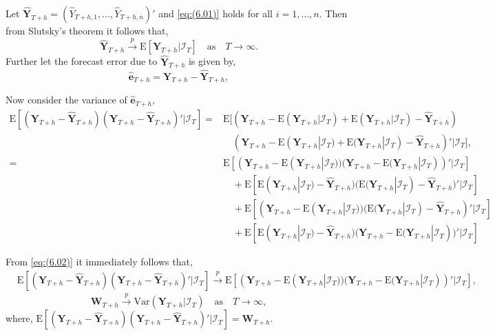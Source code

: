 \documentclass[a4paper, 11pt]{article}
\def\E{\text{E}}
\begin{document}
Let $\hat{\bm{Y}}_{T+h}=(\hat{Y}_{T+h,1},\dots,\hat{Y}_{T+h,n})'$ and \eqref{eq:(6.01)} holds for all $i=1,\dots,n$. Then from Slutsky's theorem it follows that,
\begin{equation}\label{eq:(6.02)}
\hat{\bm{Y}}_{T+h} \overset{p}{\to} \E[\bm{Y}_{T+h}|\bm{\mathcal{I}}_T] \quad \text{as} \quad T \to \infty.
\end{equation}
Further let the forecast error due to $\hat{\bm{Y}}_{T+h}$ is given by,
\begin{equation*}
\hat{\bm{e}}_{T+h} = \bm{Y}_{T+h}-\hat{\bm{Y}}_{T+h},
\end{equation*}

Now consider the variance of $\hat{\bm{e}}_{T+h}$,
\begin{align*}
\E[(\bm{Y}_{T+h} - \hat{\bm{Y}}_{T+h})(\bm{Y}_{T+h} - \hat{\bm{Y}}_{T+h})'|\bm{\mathcal{I}}_T] = &
\E[(\bm{Y}_{T+h} - \E(\bm{Y}_{T+h}|\bm{\mathcal{I}}_T) + \E(\bm{Y}_{T+h}|\bm{\mathcal{I}}_T)- \hat{\bm{Y}}_{T+h})\\
& \quad
(\bm{Y}_{T+h} - \E(\bm{Y}_{T+h}|\bm{\mathcal{I}}_T) + \E(\bm{Y}_{T+h}|\bm{\mathcal{I}}_T) - \hat{\bm{Y}}_{T+h})'|\bm{\mathcal{I}}_T],\\
= &
\E[(\bm{Y}_{T+h} - \E(\bm{Y}_{T+h}|\bm{\mathcal{I}}_T))(\bm{Y}_{T+h} - \E(\bm{Y}_{T+h}|\bm{\mathcal{I}}_T))'|\bm{\mathcal{I}}_T]\\
& \quad
+ \E[\E(\bm{Y}_{T+h}|\bm{\mathcal{I}}_T) - \hat{\bm{Y}}_{T+h})(\E(\bm{Y}_{T+h}|\bm{\mathcal{I}}_T) - \hat{\bm{Y}}_{T+h})'|\bm{\mathcal{I}}_T]\\
& \quad
+  \E[(\bm{Y}_{T+h} - \E(\bm{Y}_{T+h}|\bm{\mathcal{I}}_T))(\E(\bm{Y}_{T+h}|\bm{\mathcal{I}}_T) - \hat{\bm{Y}}_{T+h})'|\bm{\mathcal{I}}_T]\\
&  \quad
+ \E[\E(\bm{Y}_{T+h}|\bm{\mathcal{I}}_T) - \hat{\bm{Y}}_{T+h})(\bm{Y}_{T+h} - \E(\bm{Y}_{T+h}|\bm{\mathcal{I}}_T))'|\bm{\mathcal{I}}_T]
\end{align*}

From \eqref{eq:(6.02)} it immediately follows that,
\begin{align*}
&\E[(\bm{Y}_{T+h} - \hat{\bm{Y}}_{T+h})(\bm{Y}_{T+h} - \hat{\bm{Y}}_{T+h})'|\bm{\mathcal{I}}_T] \overset{p}{\to} \E[(\bm{Y}_{T+h} - \E(\bm{Y}_{T+h}|\bm{\mathcal{I}}_T))(\bm{Y}_{T+h} - \E(\bm{Y}_{T+h}|\bm{\mathcal{I}}_T))'|\bm{\mathcal{I}}_T],
\end{align*}
\begin{equation}
\bm{W}_{T+h} \overset{p}{\to} \text{Var}(\bm{Y}_{T+h}|\bm{\mathcal{I}}_T) \quad \text{as} \quad T \to \infty,
\end{equation}
where, $\E[(\bm{Y}_{T+h} - \hat{\bm{Y}}_{T+h})(\bm{Y}_{T+h} - \hat{\bm{Y}}_{T+h})'|\bm{\mathcal{I}}_T] = \bm{W}_{T+h}$.
\end{document}
